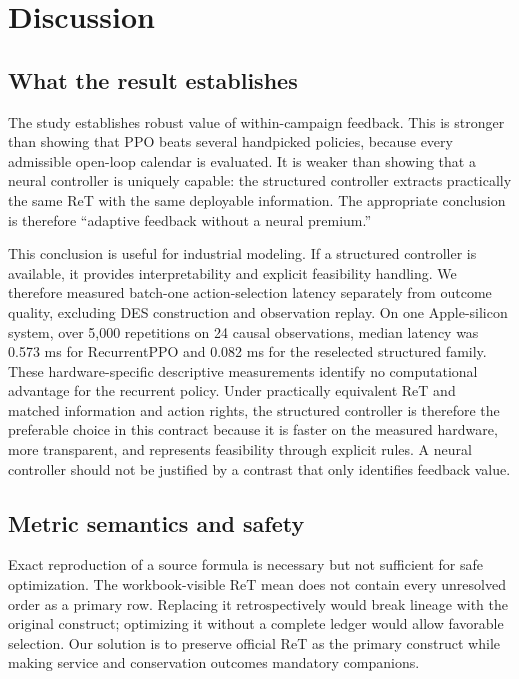 \documentclass[preprint,12pt]{elsarticle}
\begin{document}


\section{Discussion}

\subsection{What the result establishes}

The study establishes robust value of within-campaign feedback. This is stronger than showing that PPO beats several handpicked policies, because every admissible open-loop calendar is evaluated. It is weaker than showing that a neural controller is uniquely capable: the structured controller extracts practically the same ReT with the same deployable information. The appropriate conclusion is therefore ``adaptive feedback without a neural premium.''

This conclusion is useful for industrial modeling. If a structured controller is available, it provides interpretability and explicit feasibility handling. We therefore measured batch-one action-selection latency separately from outcome quality, excluding DES construction and observation replay. On one Apple-silicon system, over 5,000 repetitions on 24 causal observations, median latency was 0.573 ms for RecurrentPPO and 0.082 ms for the reselected structured family. These hardware-specific descriptive measurements identify no computational advantage for the recurrent policy. Under practically equivalent ReT and matched information and action rights, the structured controller is therefore the preferable choice in this contract because it is faster on the measured hardware, more transparent, and represents feasibility through explicit rules. A neural controller should not be justified by a contrast that only identifies feedback value.

\subsection{Metric semantics and safety}

Exact reproduction of a source formula is necessary but not sufficient for safe optimization. The workbook-visible ReT mean does not contain every unresolved order as a primary row. Replacing it retrospectively would break lineage with the original construct; optimizing it without a complete ledger would allow favorable selection. Our solution is to preserve official ReT as the primary construct while making service and conservation outcomes mandatory companions.
\end{document}
